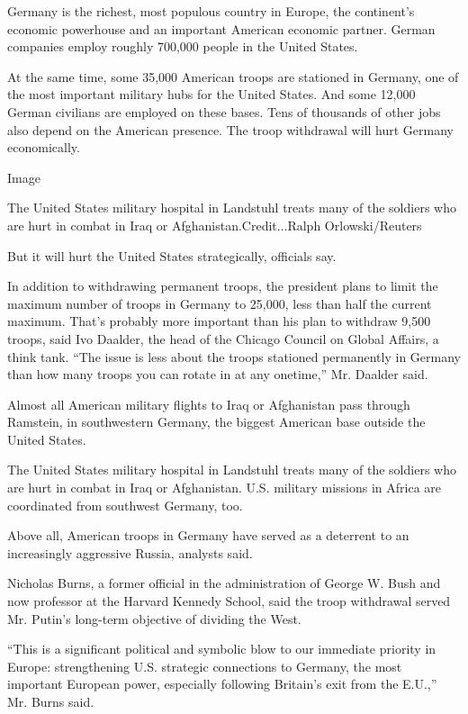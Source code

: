 Germany is the richest, most populous country in Europe, the continent's
economic powerhouse and an important American economic partner. German
companies employ roughly 700,000 people in the United States.

At the same time, some 35,000 American troops are stationed in Germany,
one of the most important military hubs for the United States. And some
12,000 German civilians are employed on these bases. Tens of thousands
of other jobs also depend on the American presence. The troop withdrawal
will hurt Germany economically.

Image

The United States military hospital in Landstuhl treats many of the
soldiers who are hurt in combat in Iraq or Afghanistan.Credit...Ralph
Orlowski/Reuters

But it will hurt the United States strategically, officials say.

In addition to withdrawing permanent troops, the president plans to
limit the maximum number of troops in Germany to 25,000, less than half
the current maximum. That's probably more important than his plan to
withdraw 9,500 troops, said Ivo Daalder, the head of the Chicago Council
on Global Affairs, a think tank. ``The issue is less about the troops
stationed permanently in Germany than how many troops you can rotate in
at any onetime,'' Mr. Daalder said.

Almost all American military flights to Iraq or Afghanistan pass through
Ramstein, in southwestern Germany, the biggest American base outside the
United States.

The United States military hospital in Landstuhl treats many of the
soldiers who are hurt in combat in Iraq or Afghanistan. U.S. military
missions in Africa are coordinated from southwest Germany, too.

Above all, American troops in Germany have served as a deterrent to an
increasingly aggressive Russia, analysts said.

Nicholas Burns, a former official in the administration of George W.
Bush and now professor at the Harvard Kennedy School, said the troop
withdrawal served Mr. Putin's long-term objective of dividing the West.

``This is a significant political and symbolic blow to our immediate
priority in Europe: strengthening U.S. strategic connections to Germany,
the most important European power, especially following Britain's exit
from the E.U.,'' Mr. Burns said.

